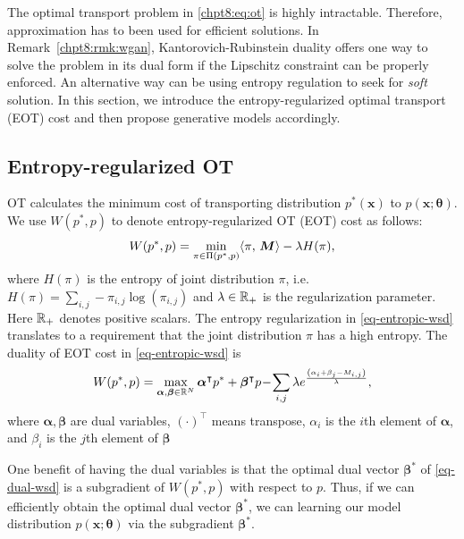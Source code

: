 The optimal transport problem in \eqref{chpt8:eq:ot} is highly intractable. Therefore, approximation has to been used for efficient solutions. In Remark~\ref{chpt8:rmk:wgan}, Kantorovich-Rubinstein duality offers one way to solve the problem in its dual form if the Lipschitz constraint can be properly enforced. An alternative way can be using entropy regulation to seek for \textit{soft} solution.  In this section, we introduce the entropy-regularized optimal transport (EOT) cost and then propose generative models accordingly.

\subsection{Entropy-regularized OT} 

OT calculates the minimum cost of transporting distribution $p^{\ast}(\bm{x})$ to $p(\bm{x}; \bm{\theta})$. We use $W(p^{\ast},p)$ to denote entropy-regularized OT (EOT) cost as follows:
\begin{equation}\label{eq-entropic-wsd}
  W(p^{\ast},p)=\min_{ \pi \in \Pi(p^{\ast}, p)} \langle \pi,\,\bm{M}\rangle - \lambda H(\pi),
\end{equation}
where $H(\pi)$ is the entropy of joint distribution $\pi$, i.e. $H(\pi) = \sum_{i,j} -\pi_{i,j}
\log(\pi_{i,j})$ and $\lambda \in \mathbb{R}_{+}$ is the regularization
parameter. Here $\mathbb{R}_{+}$ denotes positive scalars. The entropy regularization in \eqref{eq-entropic-wsd}  translates 
to a requirement that the joint distribution $\pi$ has a high entropy. 
 The duality of EOT cost in \eqref{eq-entropic-wsd} is
\begin{equation}\label{eq-dual-wsd}
  W(p^{\ast}, p)  =  \max_{\bm{\al}, \bm{\be} \in \mathbb{R}^{N}} \bm{\al}^{\intercal}p^{\ast} + \bm{\beta}^{\intercal}p \! - \!
  \sum_{i,j} \lambda e^{ \frac{{\left( \al_i + \beta_j - M_{i,j} \right)}}{\la} },\vspace{-2pt}
\end{equation}
where $\bm{\alpha},\bm{\beta}$ are dual variables, $(\cdot)^{\intercal}$ means transpose, $\alpha_i$ is the $i$th element of $\bm{\alpha}$, and $\beta_i$ is the $j$th element of $\bm{\beta}$

One benefit of having the dual variables is that the optimal dual vector $\bm{\beta}^{\ast}$
of \eqref{eq-dual-wsd} is a subgradient of $W(p^{\ast},p)$ with respect to $p$. Thus, if we can efficiently obtain the optimal dual vector $\bm{\beta}^{\ast}$, we can learning our model distribution $p(\bm{x}; \bm{\theta})$ via the subgradient $\bm{\beta}^{\ast}$.

